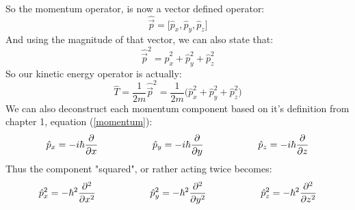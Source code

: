 \documentclass[12pt,letterpaper]{book}
\begin{document}
\paragraph*{}So the momentum operator, is now a vector defined operator:
\begin{equation}
\hat{\vec{p}} = \big[ \hat{p}_x , \hat{p}_y , \hat{p}_z \big]
\end{equation} 
And using the magnitude of that vector, we can also state that:
\begin{equation}
\hat{\vec{p}}^2 = \hat{p}_x^2 + \hat{p}_y^2 + \hat{p}_z^2 
\end{equation}
So our kinetic energy operator is actually:
\begin{equation}
\label{3D Cartesian Kinetic}
\hat{T} = \frac{1}{2m}\hat{\vec{p}}^2 = 
\frac{1}{2m}\big( \hat{p}_x^2 + \hat{p}_y^2 + \hat{p}_z^2 \big)
\end{equation}
We can also deconstruct each momentum component based on it's definition from chapter 1, equation (\ref{momentum}):
\begin{equation}
\label{momentum cartesian}
\hat{p}_x = -i\hbar \frac{\partial}{\partial x} \text{\hspace*{2cm}}
\hat{p}_y = -i\hbar \frac{\partial}{\partial y} \text{\hspace*{2cm}}
\hat{p}_z = -i\hbar \frac{\partial}{\partial z}
\end{equation}
Thus the component "squared", or rather acting twice becomes:
\begin{equation}
\label{momentum sq cartesian}
\hat{p}_x^2 = -\hbar^2 \frac{\partial^2}{\partial x^2} \text{\hspace*{2cm}}
\hat{p}_y^2 = -\hbar^2 \frac{\partial^2}{\partial y^2} \text{\hspace*{2cm}}
\hat{p}_z^2 = -\hbar^2 \frac{\partial^2}{\partial z^2}
\end{equation}
\end{document}

